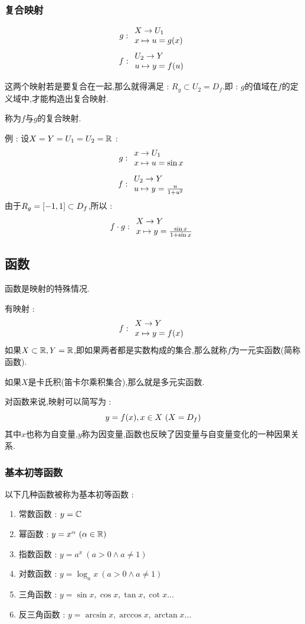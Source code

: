 {{{    \subsubsection{复合映射}{
        $$
            g : \begin{array}{l} X \to U_1 \\ x \mapsto u = g(x) \end{array}
        $$
        $$
            f : \begin{array}{l} U_2 \to Y \\ u \mapsto y = f(u) \end{array}
        $$

        这两个映射若是要复合在一起,那么就得满足 : $R_g \subset U_2 = D_f$.即 : $g$的值域在$f$的定义域中,才能构造出复合映射.

        称为$f$与$g$的复合映射.

        例 : 设$X = Y = U_1 = U_2 = \operatorname{\mathbb{R}}$ :
        $$
            g : \begin{array}{l} x \to U_1 \\ x \mapsto u = \sin x \end{array}
        $$
        $$
            f : \begin{array}{l} U_2 \to Y \\ u \mapsto y = \frac{u}{1 + u^2} \end{array}
        $$
        由于$R_g = \left[-1,1\right] \subset D_f$,所以 : $$
            f \cdot g : \begin{array}{l} X \to Y \\ x \mapsto y = \frac{\sin x}{1 + \sin x} \end{array}
        $$
    }%

}%

\subsection{函数}{
函数是映射的特殊情况.

有映射 : $$
    f : \begin{array}{l} X \to Y \\ x \mapsto y = f(x) \end{array}
$$
如果$X \subset \operatorname{\mathbb{R}},Y = \operatorname{\mathbb{R}}$,即如果两者都是实数构成的集合,那么就称$f$为一元实函数(简称函数).

如果$X$是卡氏积(笛卡尔乘积集合),那么就是多元实函数.

对函数来说,映射可以简写为 : $$
    y = f(x),x \in X\ (X = D_f)
$$
其中$x$也称为自变量,$y$称为因变量,函数也反映了因变量与自变量变化的一种因果关系.

\subsubsection{基本初等函数}{
    以下几种函数被称为基本初等函数 :

    \begin{enumerate}
        \item 常数函数 : $y = \mathbb{C}$
        \item 幂函数 : $y = x^\alpha\ (\alpha \in \operatorname{\mathbb{R}})$
        \item 指数函数 : $y = a^x\ (a > 0 \land a \neq 1)$
        \item 对数函数 : $y = \log_ax\ (a > 0 \land a \neq 1)$
        \item 三角函数 : $y = \sin x,\cos x,\tan x,\cot x...$
        \item 反三角函数 : $y = \arcsin x,\arccos x,\arctan x...$
    \end{enumerate}
}%

}}}
